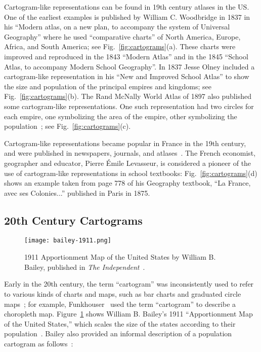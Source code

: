 \documentclass{egpubl}
\begin{document}
Cartogram-like representations can be found in 19th century atlases in the US. One of the earliest examples is published by William C. Woodbridge in 1837 in his ``Modern atlas, on a new plan, to accompany the system of Universal Geography'' where he used ``comparative charts'' of North America, Europe, Africa, and South America; see Fig.~\ref{fig:cartograms}(a). These charts were improved and reproduced in the 1843 ``Modern Atlas''  and in the 1845 ``School Atlas, to accompany Modern School Geography''. In 1837 Jesse Olney included a cartogram-like representation in his ``New and Improved School Atlas''  to show the size and population of the principal empires and kingdoms;
see Fig.~\ref{fig:cartograms}(b). The Rand McNally World Atlas of 1897 also published some cartogram-like representations. One such representation had two circles for each empire, one symbolizing the area of the empire, other symbolizing the population~\cite{school_cartography}; see Fig.~\ref{fig:cartograms}(c). 

Cartogram-like representations became popular in France in the 19th century, and were  published in newspapers, journals, and atlases~\cite{school_cartography}. The French economist, geographer and educator, Pierre \'Emile Levasseur, is considered a pioneer of the use of cartogram-like representations in school textbooks: Fig.~\ref{fig:cartograms}(d) shows an example taken from page 778 of his Geography textbook, ``La France, avec ses Colonies...'' published in Paris in 1875. 


\subsection{20th Century Cartograms}

\begin{figure}[t]
\begin{center}
\texttt{[image: bailey-1911.png]}\\
\caption{1911 Apportionment Map of the United States by William B. Bailey, published in {\em The Independent}~\cite{john_carto}.}
\label{fig:bailey}
\end{center}
\end{figure}




Early in the 20th century, the term ``cartogram'' was inconsistently used to refer to various kinds of charts and maps, such as bar charts and graduated circle maps~\cite{Bailey_carto}; for example, Funkhouser~\cite{Funk} used the term ``cartogram''  to describe a choropleth map.
Figure~\ref{fig:bailey} shows William B. Bailey's 1911 ``Apportionment Map of the United States,'' which scales the size of the states according to their population~\cite{krygier2011making}.
Bailey also provided an informal description of a population cartogram as follows~\cite{Bailey_carto}:
\end{document}
